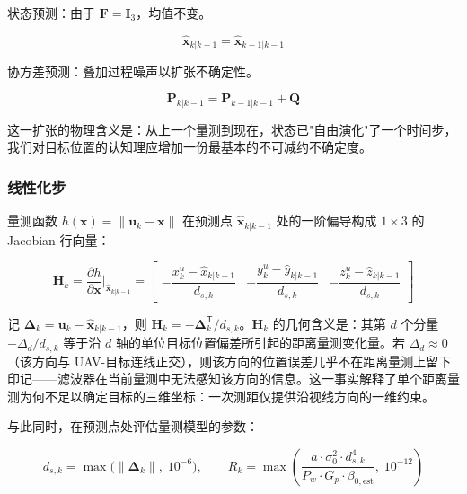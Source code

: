 状态预测：由于 $\mathbf{F} = \mathbf{I}_3$，均值不变。

\begin{equation}
\hat{\mathbf{x}}_{k|k-1} = \hat{\mathbf{x}}_{k-1|k-1}
\label{eq:ekf_pred_x}
\end{equation}

协方差预测：叠加过程噪声以扩张不确定性。

\begin{equation}
\mathbf{P}_{k|k-1} = \mathbf{P}_{k-1|k-1} + \mathbf{Q}
\label{eq:ekf_pred_P}
\end{equation}

这一扩张的物理含义是：从上一个量测到现在，状态已"自由演化"了一个时间步，我们对目标位置的认知理应增加一份最基本的不可减约不确定度。

\subsubsection{线性化步}

量测函数 $h(\mathbf{x}) = \|\mathbf{u}_k - \mathbf{x}\|$ 在预测点 $\hat{\mathbf{x}}_{k|k-1}$ 处的一阶偏导构成 $1 \times 3$ 的 Jacobian 行向量：

\begin{equation}
\mathbf{H}_k = \frac{\partial h}{\partial \mathbf{x}}\Bigr|_{\hat{\mathbf{x}}_{k|k-1}}
= \begin{bmatrix}
-\dfrac{x_k^u - \hat{x}_{k|k-1}}{d_{s,k}} &
-\dfrac{y_k^u - \hat{y}_{k|k-1}}{d_{s,k}} &
-\dfrac{z_k^u - \hat{z}_{k|k-1}}{d_{s,k}}
\end{bmatrix}
\label{eq:ekf_H_def}
\end{equation}

记 $\bm{\Delta}_k = \mathbf{u}_k - \hat{\mathbf{x}}_{k|k-1}$，则 $\mathbf{H}_k = -\bm{\Delta}_k^{\mathsf{T}} / d_{s,k}$。$\mathbf{H}_k$ 的几何含义是：其第 $d$ 个分量 $-\Delta_d / d_{s,k}$ 等于沿 $d$ 轴的单位目标位置偏差所引起的距离量测变化量。若 $\Delta_d \approx 0$（该方向与 UAV-目标连线正交），则该方向的位置误差几乎不在距离量测上留下印记——滤波器在当前量测中无法感知该方向的信息。这一事实解释了单个距离量测为何不足以确定目标的三维坐标：一次测距仅提供沿视线方向的一维约束。

与此同时，在预测点处评估量测模型的参数：

\begin{equation}
d_{s,k} = \max\bigl(\|\bm{\Delta}_k\|,\; 10^{-6}\bigr), \qquad
R_k = \max\!\left( \frac{a \cdot \sigma_0^2 \cdot d_{s,k}^4}{P_w \cdot G_p \cdot \beta_{0,\text{est}}},\; 10^{-12} \right)
\label{eq:ekf_H_params}
\end{equation}

